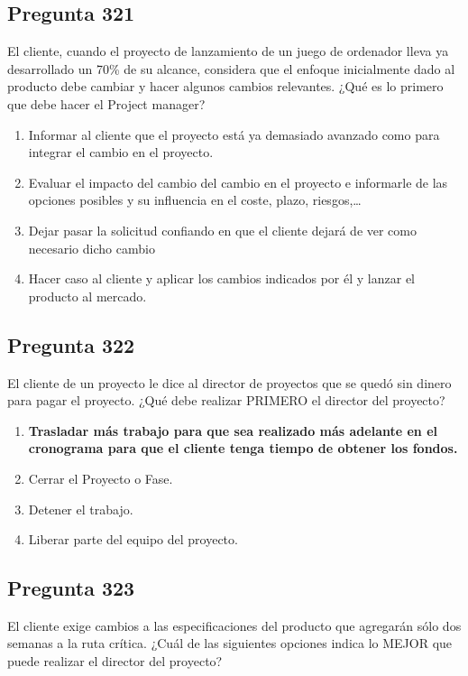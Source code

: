 \documentclass[11pt,a4paper]{article}
\begin{document}
\subsection*{Pregunta 321}
El cliente, cuando el proyecto de lanzamiento de un juego de ordenador lleva ya desarrollado un 70\% de su alcance, considera que el enfoque inicialmente dado al producto debe cambiar y hacer algunos cambios relevantes. ¿Qué es lo primero que debe hacer el Project manager?

\begin{enumerate}[label=\alph*)]
  \item Informar al cliente que el proyecto está ya demasiado avanzado como para integrar el cambio en el proyecto.
  \item Evaluar el impacto del cambio del cambio en el proyecto e informarle de las opciones posibles y su influencia en el coste, plazo, riesgos,…
  \item Dejar pasar la solicitud confiando en que el cliente dejará de ver como necesario dicho cambio
  \item Hacer caso al cliente y aplicar los cambios indicados por él y lanzar el producto al mercado.
\end{enumerate}

\subsection*{Pregunta 322}
El cliente de un proyecto le dice al director de proyectos que se quedó sin dinero para pagar el proyecto. ¿Qué debe realizar PRIMERO el director del proyecto?

\begin{enumerate}[label=\alph*)]
  \item \textbf{Trasladar más trabajo para que sea realizado más adelante en el cronograma para que el cliente tenga tiempo de obtener los fondos.}
  \item Cerrar el Proyecto o Fase.
  \item Detener el trabajo.
  \item Liberar parte del equipo del proyecto.
\end{enumerate}

\subsection*{Pregunta 323}
El cliente exige cambios a las especificaciones del producto que agregarán sólo dos semanas a la ruta crítica. ¿Cuál de las siguientes opciones indica lo MEJOR que puede realizar el director del proyecto?
\end{document}
